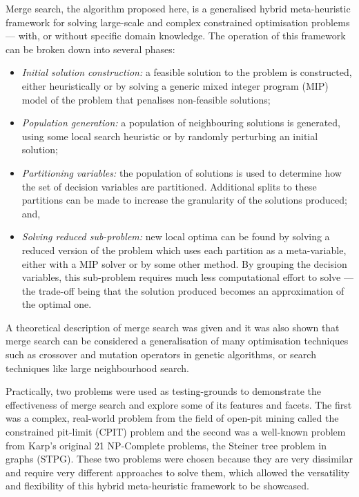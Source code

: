 \documentclass[journal]{IEEEtran}
\begin{document}
Merge search, the algorithm proposed here, is a generalised hybrid meta-heuristic framework for solving large-scale and complex constrained optimisation problems --- with, or without specific domain knowledge. The operation of this framework can be broken down into several phases:
\begin{itemize}
\item \emph{Initial solution construction:} a feasible solution to the problem is constructed, either heuristically or by solving a generic mixed integer program (MIP) model of the problem that penalises non-feasible solutions;
\item \emph{Population generation:} a population of neighbouring solutions is generated, using some local search heuristic or by randomly perturbing an initial solution;
\item \emph{Partitioning variables:} the population of solutions is used to determine how the set of decision variables are partitioned. Additional splits to these partitions can be made to increase the granularity of the solutions produced; and,
\item \emph{Solving reduced sub-problem:} new local optima can be found by solving a reduced version of the problem which uses each partition as a meta-variable, either with a MIP solver or by some other method. By grouping the decision variables, this sub-problem requires much less computational effort to solve --- the trade-off being that the solution produced becomes an approximation of the optimal one.
\end{itemize}

A theoretical description of merge search was given and it was also shown that merge search can be considered a generalisation of many optimisation techniques such as crossover and mutation operators in genetic algorithms, or search techniques like large neighbourhood search.

Practically, two problems were used as testing-grounds to demonstrate the effectiveness of merge search and explore some of its features and facets. The first was a complex, real-world problem from the field of open-pit mining called the constrained pit-limit (CPIT) problem and the second was a well-known problem from Karp's original 21 NP-Complete problems, the Steiner tree problem in graphs (STPG). These two problems were chosen because they are very dissimilar and require very different approaches to solve them, which allowed the versatility and flexibility of this hybrid meta-heuristic framework to be showcased.
\end{document}
